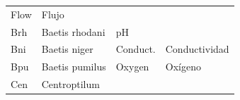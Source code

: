 \documentclass[
  spanish,
]{article}
\begin{document}
\begin{longtable}[]{@{}llll@{}}
\begin{minipage}[t]{0.14\columnwidth}
Flow\strut
\end{minipage} & \begin{minipage}[t]{0.35\columnwidth}\raggedright
Flujo\strut
\end{minipage}\tabularnewline
\begin{minipage}[t]{0.12\columnwidth}\raggedright
Brh\strut
\end{minipage} & \begin{minipage}[t]{0.27\columnwidth}\raggedright
Baetis rhodani\strut
\end{minipage} & \begin{minipage}[t]{0.14\columnwidth}\raggedright
pH\strut
\end{minipage} & \begin{minipage}[t]{0.35\columnwidth}\raggedright
\strut
\end{minipage}\tabularnewline
\begin{minipage}[t]{0.12\columnwidth}\raggedright
Bni\strut
\end{minipage} & \begin{minipage}[t]{0.27\columnwidth}\raggedright
Baetis niger\strut
\end{minipage} & \begin{minipage}[t]{0.14\columnwidth}\raggedright
Conduct.\strut
\end{minipage} & \begin{minipage}[t]{0.35\columnwidth}\raggedright
Conductividad\strut
\end{minipage}\tabularnewline
\begin{minipage}[t]{0.12\columnwidth}\raggedright
Bpu\strut
\end{minipage} & \begin{minipage}[t]{0.27\columnwidth}\raggedright
Baetis pumilus\strut
\end{minipage} & \begin{minipage}[t]{0.14\columnwidth}\raggedright
Oxygen\strut
\end{minipage} & \begin{minipage}[t]{0.35\columnwidth}\raggedright
Oxígeno\strut
\end{minipage}\tabularnewline
\begin{minipage}[t]{0.12\columnwidth}\raggedright
Cen\strut
\end{minipage} & \begin{minipage}[t]{0.27\columnwidth}\raggedright
Centroptilum\strut
\end{minipage} & \begin{minipage}[t]{0.14\columnwidth}\raggedright

\end{minipage}
\end{longtable}
\end{document}
